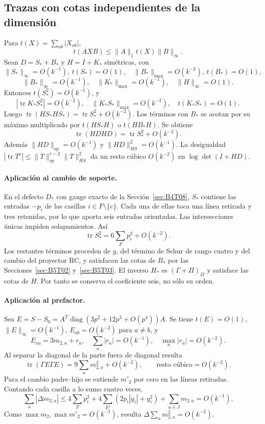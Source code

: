 \subsection{Trazas con cotas independientes de la dimensión}\label{sec:B5T04}
Para $t(X)=\sum_{ab}|X_{ab}|$,
\[
 t(AXB)\le\|A\|_1t(X)\|B\|_\infty.
\]
Sean $D=S_*+B_*$ y $H=I+K_*$ simétricas, con
\[
 \|S_*\|_\infty=O(k^{-1}),\ t(S_*)=O(1),\quad
 \|B_*\|_{\max}=O(k^{-2}),\ t(B_*)=O(1),
\]
\[
 \|B_*\|_\infty=O(k^{-1}),\quad
 \|K_*\|_{\max}=O(k^{-1}),\quad\|H\|_\infty=O(1).
\]
Entonces $t(S_*^2)=O(k^{-1})$, y
\[
 |\operatorname{tr}K_*S_*^2|=O(k^{-2}),\quad
 \|K_*S_*\|_{\max}=O(k^{-2}),\quad t(K_*S_*)=O(1).
\]
Luego $\operatorname{tr}(HS_*HS_*)=\operatorname{tr}S_*^2+O(k^{-2})$.
Los términos con $B_*$ se acotan por su máximo multiplicado por
$t(HS_*H)$ o $t(HB_*H)$. Se obtiene
\[
 \boxed{\operatorname{tr}(HDHD)=\operatorname{tr}S_*^2+O(k^{-2}).}
\]
Además $\|HD\|_{op}=O(k^{-1})$ y $\|HD\|_{HS}^2=O(k^{-1})$.
La desigualdad $|\operatorname{tr}T^r|\le\|T\|_{op}^{r-2}\|T\|_{HS}^2$
da un resto cúbico $O(k^{-2})$ en $\log\det(I+HD)$.

\paragraph{Aplicación al cambio de soporte.}
En el defecto $D_*$ con gauge exacto de la Sección~\ref{sec:B4T08}, $S_*$ contiene
las entradas $-p_i$ de las casillas $i\in F\setminus\{c\}$.
Cada una de ellas toca una línea retirada y tres retenidas, por lo que aporta seis
entradas orientadas. Las intersecciones únicas impiden solapamientos.
Así
\[
 \operatorname{tr}S_*^2=6\sum_Fp_i^2+O(k^{-2}).
\]
Los restantes términos proceden de $y$, del término de Schur de rango cuatro y del cambio del
proyector RC, y satisfacen las cotas de $B_*$ por las Secciones~\ref{sec:B5T02} y~\ref{sec:B5T03}.
El inverso $H_*$ es $(\Gamma+\Pi)_{II}$ y satisface las cotas de $H$.
Por tanto se conserva el coeficiente seis, no sólo su orden.

\paragraph{Aplicación al prefactor.}
Sea $E=S-S_0=A^T\operatorname{diag}(3p^2+12p^3+O(p^4))A$.
Se tiene $t(E)=O(1)$, $\|E\|_\infty=O(k^{-1})$,
$E_{ab}=O(k^{-2})$ para $a\ne b$, y
\[
 E_{aa}=3m_{2,a}+r_a,\quad\sum_a|r_a|=O(k^{-1}),
 \quad\max_a|r_a|=O(k^{-2}).
\]
Al separar la diagonal de la parte fuera de diagonal resulta
\[
 \operatorname{tr}(\Gamma E\Gamma E)
 =9\sum_a m_{2,a}^2+O(k^{-2}),\qquad
 \text{resto cúbico}=O(k^{-2}).
\]
Para el cambio padre--hijo se extiende $m'_2$ por cero en las líneas retiradas.
Contando cada casilla a lo sumo cuatro veces,
\[
 \sum_a|\Delta m_{2,a}|\le
 4\sum_Fp_i^2+4\sum_{E'}(2p_i|y_i|+y_i^2)+\sum_{a\in J}m_{2,a}
 =O(k^{-1}).
\]
Como $\max m_2,\max m'_2=O(k^{-1})$, resulta
$\Delta\sum_a m_{2,a}^2=O(k^{-2})$.

